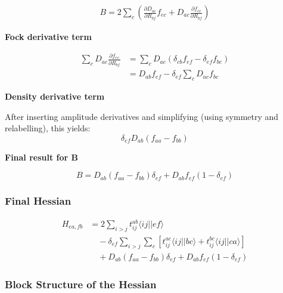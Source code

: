 \begin{align}
B = 2\sum_c
\left(
\frac{\partial D_{ac}}{\partial R_{bf}}f_{ec}
+
D_{ac}\frac{\partial f_{ec}}{\partial R_{bf}}
\right)
\end{align}

\textbf{Fock derivative term}

\begin{align}
\sum_c D_{ac}\frac{\partial f_{ec}}{\partial R_{bf}}
&=
\sum_c D_{ac}
\left(
\delta_{cb}f_{ef}
- \delta_{ef}f_{bc}
\right)
\\
&=
D_{ab}f_{ef}
- \delta_{ef}\sum_c D_{ac}f_{bc}
\end{align}

\textbf{Density derivative term}

After inserting amplitude derivatives and simplifying (using symmetry and relabelling), this yields:
\begin{equation}
\delta_{ef} D_{ab}(f_{aa} - f_{bb})
\end{equation}

\textbf{Final result for B}

\begin{equation}
B =
D_{ab}(f_{aa}-f_{bb})\delta_{ef}
+ D_{ab} f_{ef}(1-\delta_{ef})
\end{equation}

\subsubsection{Final Hessian}

\begin{align}
H_{ea,fb} &=
2\sum_{i>j} t_{ij}^{ab}\langle ij||ef\rangle
\\
&\quad
- \delta_{ef}\sum_{i>j}\sum_c
\left[
t_{ij}^{ac}\langle ij||bc\rangle
+
t_{ij}^{bc}\langle ij||ca\rangle
\right]
\\
&\quad
+ D_{ab}(f_{aa}-f_{bb})\delta_{ef}
+ D_{ab} f_{ef}(1-\delta_{ef})
\end{align}


\subsubsection{Block Structure of the Hessian}

